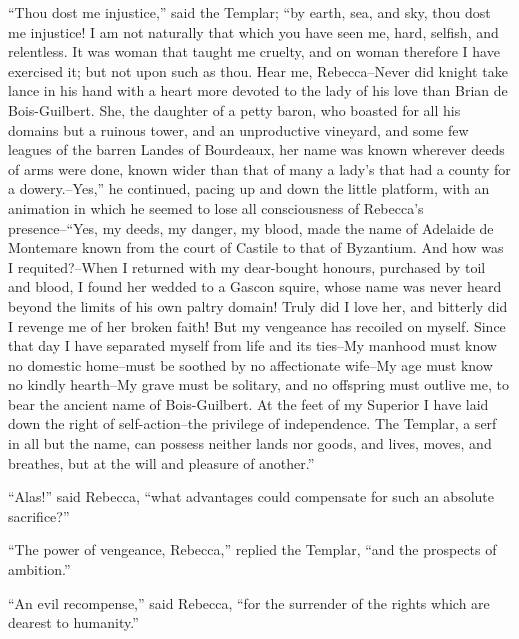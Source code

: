 ``Thou dost me injustice,'' said the Templar; ``by earth, sea, and sky,
thou dost me injustice! I am not naturally that which you have seen me,
hard, selfish, and relentless. It was woman that taught me cruelty, and
on woman therefore I have exercised it; but not upon such as thou. Hear
me, Rebecca--Never did knight take lance in his hand with a heart more
devoted to the lady of his love than Brian de Bois-Guilbert. She, the
daughter of a petty baron, who boasted for all his domains but a ruinous
tower, and an unproductive vineyard, and some few leagues of the barren
Landes of Bourdeaux, her name was known wherever deeds of arms were
done, known wider than that of many a lady's that had a county for a
dowery.--Yes,'' he continued, pacing up and down the little platform,
with an animation in which he seemed to lose all consciousness of
Rebecca's presence--``Yes, my deeds, my danger, my blood, made the name
of Adelaide de Montemare known from the court of Castile to that of
Byzantium. And how was I requited?--When I returned with my dear-bought
honours, purchased by toil and blood, I found her wedded to a Gascon
squire, whose name was never heard beyond the limits of his own paltry
domain! Truly did I love her, and bitterly did I revenge me of her
broken faith! But my vengeance has recoiled on myself. Since that day I
have separated myself from life and its ties--My manhood must know no
domestic home--must be soothed by no affectionate wife--My age must know
no kindly hearth--My grave must be solitary, and no offspring must
outlive me, to bear the ancient name of Bois-Guilbert. At the feet of my
Superior I have laid down the right of self-action--the privilege of
independence. The Templar, a serf in all but the name, can possess
neither lands nor goods, and lives, moves, and breathes, but at the will
and pleasure of another.''

``Alas!'' said Rebecca, ``what advantages could compensate for such an
absolute sacrifice?''

``The power of vengeance, Rebecca,'' replied the Templar, ``and the
prospects of ambition.''

``An evil recompense,'' said Rebecca, ``for the surrender of the rights
which are dearest to humanity.''

